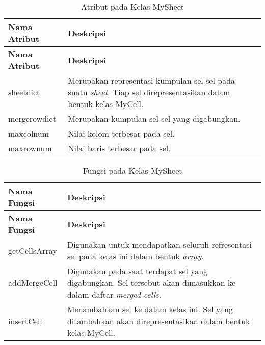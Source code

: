\begin{small}
\begin{longtable}{ | p{3cm} | p{8cm} | }
    \caption{Atribut pada Kelas MySheet}
    \label{AtributMySheet}\\ \hline
    \centering\bfseries{Nama Atribut} & \centering\bfseries{Deskripsi} \tabularnewline \hline
    \endfirsthead
    \hline
    \centering\bfseries{Nama Atribut} & \centering\bfseries{Deskripsi} \tabularnewline \hline
    \endhead
    sheetdict & Merupakan representasi kumpulan sel-sel pada suatu \textit{sheet}. Tiap sel direpresentasikan dalam bentuk kelas MyCell.\\ \hline
    mergerowdict & Merupakan kumpulan sel-sel yang digabungkan.\\ \hline
    maxcolnum & Nilai kolom terbesar pada sel.\\ \hline
    maxrownum & Nilai baris terbesar pada sel.\\ \hline
\end{longtable}
\end{small}

\begin{small}
\begin{longtable}{ | p{4cm} | p{9cm} | }
    \caption{Fungsi pada Kelas MySheet}
    \label{FungsiMySheet}\\ \hline
    \centering\bfseries{Nama Fungsi} & \centering\bfseries{Deskripsi} \tabularnewline \hline
    \endfirsthead
    \hline
    \centering\bfseries{Nama Fungsi} & \centering\bfseries{Deskripsi} \tabularnewline \hline
    \endhead
    getCellsArray & Digunakan untuk mendapatkan seluruh refresentasi sel pada kelas ini dalam bentuk \textit{array}.\\ \hline
    addMergeCell & Digunakan pada saat terdapat sel yang digabungkan. Sel tersebut akan dimasukkan ke dalam daftar \textit{merged cells}.\\ \hline
    insertCell & Menambahkan sel ke dalam kelas ini. Sel yang ditambahkan akan direpresentasikan dalam bentuk kelas MyCell.\\ \hline
\end{longtable}
\end{small}

